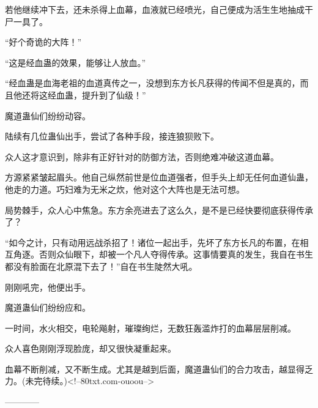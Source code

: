 \begin{this_body}
若他继续冲下去，还未杀得上血幕，血液就已经喷光，自己便成为活生生地抽成干尸一具了。

“好个奇诡的大阵！”

“这是经血蛊的效果，能够让人放血。”

“经血蛊是血海老祖的血道真传之一，没想到东方长凡获得的传闻不但是真的，而且他还将这经血蛊，提升到了仙级！”

魔道蛊仙们纷纷动容。

陆续有几位蛊仙出手，尝试了各种手段，接连狼狈败下。

众人这才意识到，除非有正好针对的防御方法，否则绝难冲破这道血幕。

方源紧紧皱起眉头。他自己纵然前世是位血道强者，但手头上却无任何血道仙蛊，他走的力道。巧妇难为无米之炊，他对这个大阵也是无法可想。

局势棘手，众人心中焦急。东方余亮进去了这么久，是不是已经快要彻底获得传承了？

“如今之计，只有动用远战杀招了！诸位一起出手，先坏了东方长凡的布置，在相互角逐。否则众仙眼下，却被一个凡人夺得传承。这事情要真的发生，我自在书生都没有脸面在北原混下去了！”自在书生陡然大吼。

刚刚吼完，他便出手。

魔道蛊仙们纷纷应和。

一时间，水火相交，电轮飚射，璀璨绚烂，无数狂轰滥炸打的血幕层层削减。

众人喜色刚刚浮现脸庞，却又很快凝重起来。

血幕不断削减，又不断生成。尤其是越到后面，魔道蛊仙们的合力攻击，越显得乏力。(未完待续。)<!--80txt.com-ouoou-->

------------

\end{this_body}

